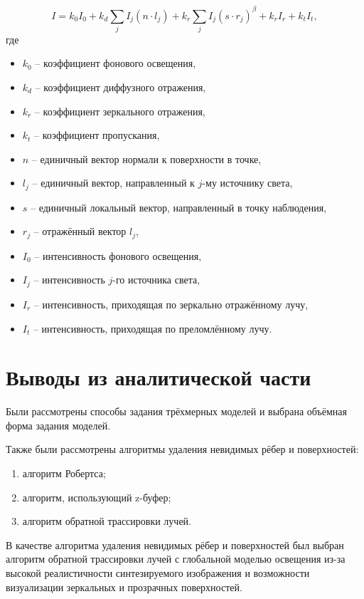 \begin{equation}
	I = k_0I_0 + k_d\sum\limits_{j}^{}I_j(n \cdot l_j) + k_r\sum\limits_{j}^{}I_j(s \cdot r_j)^{\beta}+k_rI_r+k_tI_t,
\end{equation}
где
\begin{itemize}[label=---]
	\item $k_0$ -- коэффициент фонового освещения,
	
	\item  $k_d$ -- коэффициент диффузного отражения,
	
	\item  $k_r$ -- коэффициент зеркального отражения,
	
	\item  $k_t$ -- коэффициент пропускания,
	
	\item  $n$ -- единичный вектор нормали к поверхности в точке,
	
	\item  $l_j$ -- единичный вектор, направленный к $j$-му источнику света,
	
	\item  $s$ -- единичный локальный вектор, направленный в точку наблюдения,
	
	\item  $r_j$ -- отражённый вектор $l_j$,
	
	\item  $I_0$ -- интенсивность фонового освещения,
	
	\item  $I_j$ -- интенсивность $j$-го источника света,
	
	\item  $I_r$ --  интенсивность, приходящая по зеркально отражённому лучу,
	
	\item  $I_t$ -- интенсивность, приходящая по преломлённому лучу.
\end{itemize}

\section{Выводы из аналитической части}
Были рассмотрены способы задания трёхмерных моделей и выбрана объёмная форма задания моделей.

Также были рассмотрены алгоритмы удаления невидимых рёбер и поверхностей:
\begin{enumerate}[label=\arabic*)]
	\item алгоритм Робертса;
	\item алгоритм, использующий z-буфер;
	\item алгоритм обратной трассировки лучей.
\end{enumerate}
В качестве  алгоритма удаления невидимых рёбер и поверхностей был выбран алгоритм обратной трассировки лучей с глобальной моделью освещения из-за высокой реалистичности синтезируемого изображения и возможности визуализации зеркальных и прозрачных поверхностей.
 
